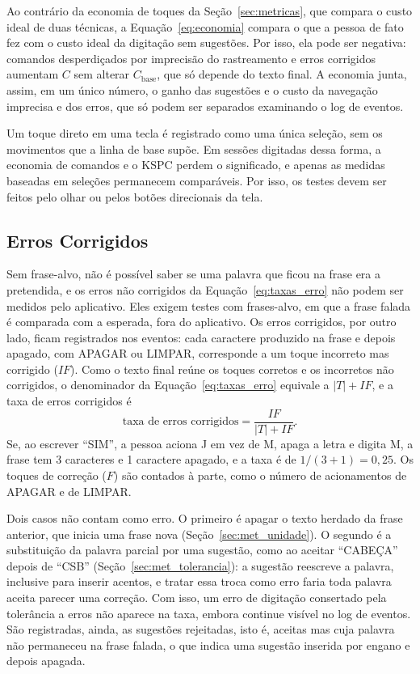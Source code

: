 Ao contrário da economia de toques da Seção~\ref{sec:metricas}, que compara o custo ideal de duas técnicas, a Equação~\ref{eq:economia} compara o que a pessoa de fato fez com o custo ideal da digitação sem sugestões. Por isso, ela pode ser negativa: comandos desperdiçados por imprecisão do rastreamento e erros corrigidos aumentam $C$ sem alterar $C_{\text{base}}$, que só depende do texto final. A economia junta, assim, em um único número, o ganho das sugestões e o custo da navegação imprecisa e dos erros, que só podem ser separados examinando o log de eventos.

Um toque direto em uma tecla é registrado como uma única seleção, sem os movimentos que a linha de base supõe. Em sessões digitadas dessa forma, a economia de comandos e o KSPC perdem o significado, e apenas as medidas baseadas em seleções permanecem comparáveis. Por isso, os testes devem ser feitos pelo olhar ou pelos botões direcionais da tela.

\subsection{Erros Corrigidos} \label{sec:met_erros}

Sem frase-alvo, não é possível saber se uma palavra que ficou na frase era a pretendida, e os erros não corrigidos da Equação~\ref{eq:taxas_erro} não podem ser medidos pelo aplicativo. Eles exigem testes com frases-alvo, em que a frase falada é comparada com a esperada, fora do aplicativo. Os erros corrigidos, por outro lado, ficam registrados nos eventos: cada caractere produzido na frase e depois apagado, com APAGAR ou LIMPAR, corresponde a um toque incorreto mas corrigido ($IF$). Como o texto final reúne os toques corretos e os incorretos não corrigidos, o denominador da Equação~\ref{eq:taxas_erro} equivale a $|T| + IF$, e a taxa de erros corrigidos é
\begin{equation}
    \text{taxa de erros corrigidos} = \frac{IF}{|T| + IF}.
    \label{eq:erros_corrigidos}
\end{equation}
Se, ao escrever ``SIM'', a pessoa aciona J em vez de M, apaga a letra e digita M, a frase tem 3 caracteres e 1 caractere apagado, e a taxa é de $1/(3+1) = 0{,}25$. Os toques de correção ($F$) são contados à parte, como o número de acionamentos de APAGAR e de LIMPAR.

Dois casos não contam como erro. O primeiro é apagar o texto herdado da frase anterior, que inicia uma frase nova (Seção~\ref{sec:met_unidade}). O segundo é a substituição da palavra parcial por uma sugestão, como ao aceitar ``CABEÇA'' depois de ``CSB'' (Seção~\ref{sec:met_tolerancia}): a sugestão reescreve a palavra, inclusive para inserir acentos, e tratar essa troca como erro faria toda palavra aceita parecer uma correção. Com isso, um erro de digitação consertado pela tolerância a erros não aparece na taxa, embora continue visível no log de eventos. São registradas, ainda, as sugestões rejeitadas, isto é, aceitas mas cuja palavra não permaneceu na frase falada, o que indica uma sugestão inserida por engano e depois apagada.

